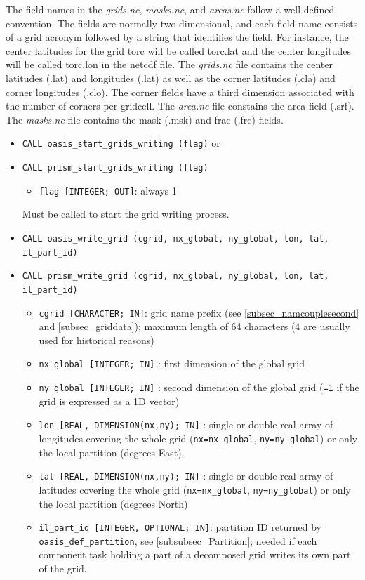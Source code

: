 The field names in the {\em grids.nc}, {\em masks.nc}, and {\em
  areas.nc} follow a well-defined convention.  The fields are normally
two-dimensional, and each field name consists of a grid acronym followed by a string that identifies the field.  For instance, the center latitudes for the grid torc will be called torc.lat and the center longitudes will be called torc.lon in the netcdf file.  The {\em grids.nc} file contains the center latitudes (.lat) and longitudes (.lat) as well as the corner latitudes (.cla) and corner longitudes (.clo).  The corner fields have a third dimension associated with the number of corners per gridcell.  The {\em area.nc} file constains the area field (.srf).  The {\em masks.nc} file contains the mask (.msk) and frac (.frc) fields.

\begin{itemize}

\item {\tt CALL oasis\_start\_grids\_writing (flag)} or
\item {\tt CALL prism\_start\_grids\_writing (flag)}
  \begin{itemize}
  \item {\tt flag [INTEGER; OUT]}: always 1 
  \end{itemize} 
Must be called to start the grid writing process. 
  
  \vspace{0.2cm}
\item {\tt CALL oasis\_write\_grid (cgrid, nx\_global, ny\_global, lon, lat, il\_part\_id)}
\item {\tt CALL prism\_write\_grid (cgrid, nx\_global, ny\_global, lon, lat, il\_part\_id)}
        
  \begin{itemize}
  \item {\tt cgrid [CHARACTER; IN]}: grid name prefix (see
    \ref{subsec_namcouplesecond} and \ref{subsec_griddata}); maximum length of 64 characters (4 are usually used for historical reasons)
  \item {\tt nx\_global [INTEGER; IN]} : first dimension of the global grid 
  \item {\tt ny\_global [INTEGER; IN]} : second dimension of the global grid ({\tt =1} if the grid is expressed as a 1D vector) 
  \item {\tt lon [REAL, DIMENSION(nx,ny); IN]} : single or double real array of longitudes covering the whole grid ({\tt nx=nx\_global}, {\tt ny=ny\_global}) or only the local partition (degrees East).
  \item {\tt lat [REAL, DIMENSION(nx,ny); IN]} : single or double real array of latitudes covering the whole grid ({\tt nx=nx\_global}, {\tt ny=ny\_global}) or only the local partition (degrees North)
\item  {\tt il\_part\_id [INTEGER, OPTIONAL; IN]}: partition ID returned by {\tt oasis\_def\_partition}, see \ref{subsubsec_Partition}; needed if each component task holding a part of a decomposed grid writes its own part of the grid.
  \end{itemize}


\end{itemize}
